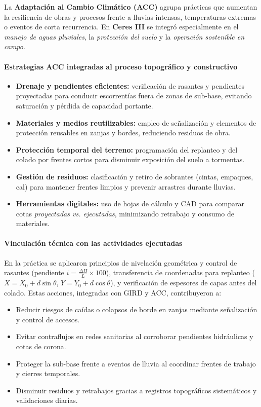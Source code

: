 \documentclass[12pt]{article}
\begin{document}
	La \textbf{Adaptación al Cambio Climático (ACC)} agrupa prácticas que aumentan la resiliencia de obras y procesos frente a lluvias intensas, temperaturas extremas o eventos de corta recurrencia. En \textbf{Ceres III} se integró especialmente en el \emph{manejo de aguas pluviales}, la \emph{protección del suelo} y la \emph{operación sostenible en campo}.
	
	\paragraph{Estrategias ACC integradas al proceso topográfico y constructivo}
	\begin{itemize}
		\item \textbf{Drenaje y pendientes eficientes:} verificación de rasantes y pendientes proyectadas para conducir escorrentías fuera de zonas de sub-base, evitando saturación y pérdida de capacidad portante.
		\item \textbf{Materiales y medios reutilizables:} empleo de señalización y elementos de protección reusables en zanjas y bordes, reduciendo residuos de obra.
		\item \textbf{Protección temporal del terreno:} programación del replanteo y del colado por frentes cortos para disminuir exposición del suelo a tormentas.
		\item \textbf{Gestión de residuos:} clasificación y retiro de sobrantes (cintas, empaques, cal) para mantener frentes limpios y prevenir arrastres durante lluvias.
		\item \textbf{Herramientas digitales:} uso de hojas de cálculo y CAD para comparar cotas \emph{proyectadas vs. ejecutadas}, minimizando retrabajo y consumo de materiales.
	\end{itemize}
	
	\paragraph{Vinculación técnica con las actividades ejecutadas}
	En la práctica se aplicaron principios de nivelación geométrica y control de rasantes (pendiente $i = \frac{\Delta H}{L}\times 100$), transferencia de coordenadas para replanteo ($X = X_0 + d\sin\theta$, $Y = Y_0 + d\cos\theta$), y verificación de espesores de capas antes del colado. Estas acciones, integradas con GIRD y ACC, contribuyeron a:
	\begin{itemize}
		\item Reducir riesgos de caídas o colapsos de borde en zanjas mediante señalización y control de accesos.
		\item Evitar contraflujos en redes sanitarias al corroborar pendientes hidráulicas y cotas de corona.
		\item Proteger la sub-base frente a eventos de lluvia al coordinar frentes de trabajo y cierres temporales.
		\item Disminuir residuos y retrabajos gracias a registros topográficos sistemáticos y validaciones diarias.
	\end{itemize}
	
\end{document}
